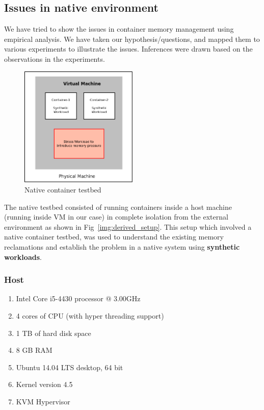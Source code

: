   
    \subsection{Issues in native environment}
    
      We have tried to show the issues in container memory management using empirical analysis. We have taken our hypothesis/questions, 
      and mapped them to various experiments to illustrate the issues. Inferences were drawn based on the observations in the experiments. 
    
      \begin{figure}
	\centering
	\includegraphics[width=0.5\textwidth]{images/controller_issues/native_testbed.png}
	\caption{Native container testbed}
	\label{img:native_setup}
      \end{figure}
      
       The native testbed consisted of running containers inside a host machine (running inside VM in our case) in complete isolation from 
the external environment as shown in Fig~\ref{img:derived_setup}. This setup which involved a native container testbed, was used to 
understand the existing memory reclamations and establish the problem in a native system using \textbf{synthetic workloads}.
	
      \subsubsection{Host}
	
	\begin{enumerate}
	  \item Intel Core i5-4430 processor @ 3.00GHz
	  \item 4 cores of CPU (with hyper threading support)
	  \item 1 TB of hard disk space
	  \item 8 GB RAM
	  \item Ubuntu 14.04 LTS desktop, 64 bit 
	  \item Kernel version 4.5
	  \item KVM Hypervisor
	\end{enumerate}
      
